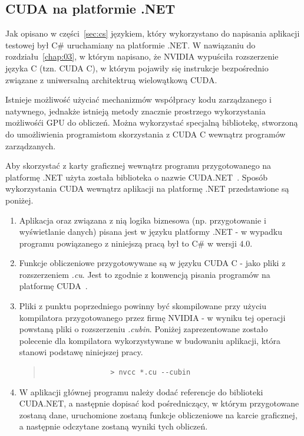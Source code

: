 \subsection{CUDA na platformie .NET}
Jak opisano w części~\ref{sec:cs} językiem, który wykorzystano do napisania aplikacji testowej był C\# uruchamiany na platformie .NET. W nawiązaniu do rozdziału~\ref{chap:03}, w którym napisano, że NVIDIA wypuściła rozszerzenie języka C (tzn. CUDA C), w którym pojawiły się instrukcje bezpośrednio związane z uniwersalną architektruą wielowątkową CUDA.

Istnieje możliwość użyciać mechanizmów współpracy kodu zarządzanego i natywnego, jednakże istnieją metody znacznie prostrzego wykorzystania możliwośći GPU do obliczeń. Można wykorzystać specjalną bibliotekę, stworzoną do umożliwienia programistom skorzystania z CUDA C wewnątrz programów zarządzanych.

Aby skorzystać z karty graficznej wewnątrz programu przygotowanego na platformę .NET użyta została biblioteka o nazwie CUDA.NET~\cite{cuda:net}. Sposób wykorzystania CUDA wewnątrz aplikacji na platformę .NET przedstawione są poniżej.

\begin{enumerate}
	\item Aplikacja oraz związana z nią logika biznesowa (np. przygotowanie i wyświetlanie danych) pisana jest w języku platformy .NET - w wypadku programu powiązanego z niniejszą pracą był to C\# w wersji $4.0$.
	\item Funkcje obliczeniowe przygotowywane są w języku CUDA C - jako pliki z rozszerzeniem \emph{.cu}. Jest to zgodnie z konwencją pisania programów na platformę CUDA~\cite{Cuda:PGuide}.
	\item Pliki z punktu poprzedniego powinny być skompilowane przy użyciu kompilatora przygotowanego przez firmę NVIDIA - w wyniku tej operacji powstaną pliki o rozszerzeniu \emph{.cubin}. Poniżej zaprezentowane zostało polecenie dla kompilatora wykorzystywane w budowaniu aplikacji, która stanowi podstawę niniejszej pracy.
		\begin{quote}
			\begin{verbatim}
				> nvcc *.cu --cubin
			\end{verbatim}
		\end{quote}
	\item W aplikacji głównej programu należy dodać referencje do biblioteki CUDA.NET, a następnie dopisać kod pośredniczący, w którym przygotowane zostaną dane, uruchomione zostaną funkcje obliczeniowe na karcie graficznej, a następnie odczytane zostaną wyniki tych obliczeń.
\end{enumerate}

